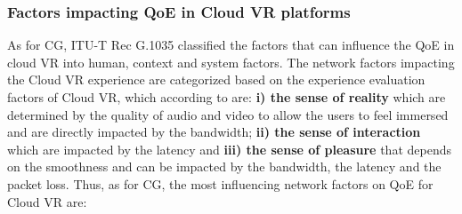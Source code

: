 \subsubsection{Factors impacting QoE in Cloud VR platforms}

As for CG, ITU-T Rec G.1035 \cite{itut1035} classified the factors that can influence the QoE in cloud VR into human, context and system factors.
The network factors impacting the Cloud VR experience are categorized based on the experience evaluation factors of Cloud VR, which according to \cite{huawei} are: \textbf{i) the sense of reality} which are determined by the quality of audio and video to allow the users to feel immersed and are directly impacted by the bandwidth; \textbf{ii) the sense of interaction} which are impacted by the latency and \textbf{iii) the sense of pleasure} that depends on the smoothness and can be impacted by the bandwidth, the latency and the packet loss.
Thus, as for CG, the most influencing network factors on QoE for Cloud VR are:
